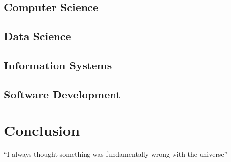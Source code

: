 \documentclass{article}
\begin{document}
\subsection{Computer Science}


\subsection{Data Science}


\subsection{Information Systems}


\subsection{Software Development}

\section{Conclusion}
``I always thought something was fundamentally wrong with the universe'' \citep{adams1995hitchhiker}



\end{document}
